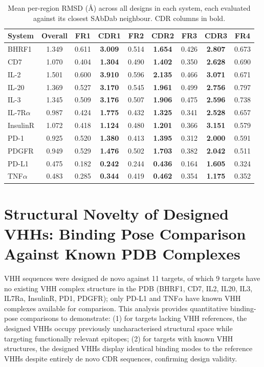 \documentclass[11pt]{article}
\begin{document}
\begin{table}[!htbp]
\centering
\begin{tabular}{l*{8}{c}}
\toprule
System & Overall & FR1 & CDR1 & FR2 & CDR2 & FR3 & CDR3 & FR4\\
\midrule
BHRF1    & 1.349 & 0.611 & \textbf{3.009} & 0.514 & \textbf{1.654} & 0.426 & \textbf{2.807} & 0.673\\
CD7      & 1.070 & 0.404 & \textbf{1.304} & 0.490 & \textbf{1.402} & 0.350 & \textbf{2.628} & 0.690\\
IL-2     & 1.501 & 0.600 & \textbf{3.910} & 0.596 & \textbf{2.135} & 0.466 & \textbf{3.071} & 0.671\\
IL-20    & 1.369 & 0.527 & \textbf{3.170} & 0.545 & \textbf{1.961} & 0.499 & \textbf{2.756} & 0.797\\
IL-3     & 1.345 & 0.509 & \textbf{3.176} & 0.507 & \textbf{1.906} & 0.475 & \textbf{2.596} & 0.738\\
IL-7R$\alpha$ & 0.987 & 0.424 & \textbf{1.775} & 0.432 & \textbf{1.325} & 0.341 & \textbf{2.528} & 0.657\\
InsulinR & 1.072 & 0.418 & \textbf{1.124} & 0.480 & \textbf{1.201} & 0.366 & \textbf{3.151} & 0.579\\
PD-1     & 0.925 & 0.520 & \textbf{1.380} & 0.413 & \textbf{1.395} & 0.312 & \textbf{2.000} & 0.591\\
PDGFR    & 0.949 & 0.529 & \textbf{1.476} & 0.502 & \textbf{1.703} & 0.382 & \textbf{2.042} & 0.511\\
PD-L1    & 0.475 & 0.182 & \textbf{0.242} & 0.244 & \textbf{0.436} & 0.164 & \textbf{1.605} & 0.324\\
TNF$\alpha$  & 0.483 & 0.285 & \textbf{0.344} & 0.419 & \textbf{0.462} & 0.354 & \textbf{1.175} & 0.352\\
\bottomrule
\end{tabular}
\caption{Mean per-region RMSD (\AA{}) across all designs in each system, each evaluated against its
closest SAbDab neighbour. CDR columns in bold.}
\label{tab:sabdab_all}
\end{table}

\section{Structural Novelty of Designed VHHs: Binding Pose Comparison Against Known PDB Complexes}
\label{app:C}
VHH sequences were designed de novo against 11 targets, of which 9 targets have no existing VHH complex
structure in the PDB (BHRF1, CD7, IL2, IL20, IL3, IL7Ra, InsulinR, PD1, PDGFR); only PD-L1 and TNF$\alpha$
have known VHH complexes available for comparison. This analysis provides quantitative binding-pose
comparisons to demonstrate: (1) for targets lacking VHH references, the designed VHHs occupy previously
uncharacterised structural space while targeting functionally relevant epitopes; (2) for targets with known
VHH structures, the designed VHHs display identical binding modes to the reference VHHs despite entirely
de novo CDR sequences, confirming design validity.
\end{document}
